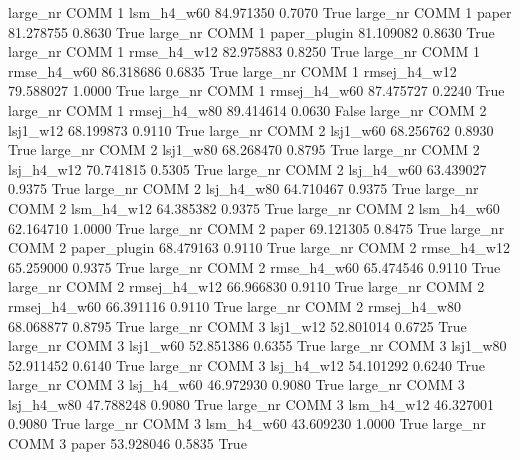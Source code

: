   large_nr     COMM                 1   lsm_h4_w60   84.971350      0.7070    True
  large_nr     COMM                 1        paper   81.278755      0.8630    True
  large_nr     COMM                 1 paper_plugin   81.109082      0.8630    True
  large_nr     COMM                 1  rmse_h4_w12   82.975883      0.8250    True
  large_nr     COMM                 1  rmse_h4_w60   86.318686      0.6835    True
  large_nr     COMM                 1 rmsej_h4_w12   79.588027      1.0000    True
  large_nr     COMM                 1 rmsej_h4_w60   87.475727      0.2240    True
  large_nr     COMM                 1 rmsej_h4_w80   89.414614      0.0630   False
  large_nr     COMM                 2     lsj1_w12   68.199873      0.9110    True
  large_nr     COMM                 2     lsj1_w60   68.256762      0.8930    True
  large_nr     COMM                 2     lsj1_w80   68.268470      0.8795    True
  large_nr     COMM                 2   lsj_h4_w12   70.741815      0.5305    True
  large_nr     COMM                 2   lsj_h4_w60   63.439027      0.9375    True
  large_nr     COMM                 2   lsj_h4_w80   64.710467      0.9375    True
  large_nr     COMM                 2   lsm_h4_w12   64.385382      0.9375    True
  large_nr     COMM                 2   lsm_h4_w60   62.164710      1.0000    True
  large_nr     COMM                 2        paper   69.121305      0.8475    True
  large_nr     COMM                 2 paper_plugin   68.479163      0.9110    True
  large_nr     COMM                 2  rmse_h4_w12   65.259000      0.9375    True
  large_nr     COMM                 2  rmse_h4_w60   65.474546      0.9110    True
  large_nr     COMM                 2 rmsej_h4_w12   66.966830      0.9110    True
  large_nr     COMM                 2 rmsej_h4_w60   66.391116      0.9110    True
  large_nr     COMM                 2 rmsej_h4_w80   68.068877      0.8795    True
  large_nr     COMM                 3     lsj1_w12   52.801014      0.6725    True
  large_nr     COMM                 3     lsj1_w60   52.851386      0.6355    True
  large_nr     COMM                 3     lsj1_w80   52.911452      0.6140    True
  large_nr     COMM                 3   lsj_h4_w12   54.101292      0.6240    True
  large_nr     COMM                 3   lsj_h4_w60   46.972930      0.9080    True
  large_nr     COMM                 3   lsj_h4_w80   47.788248      0.9080    True
  large_nr     COMM                 3   lsm_h4_w12   46.327001      0.9080    True
  large_nr     COMM                 3   lsm_h4_w60   43.609230      1.0000    True
  large_nr     COMM                 3        paper   53.928046      0.5835    True
